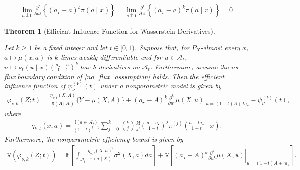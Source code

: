 \documentclass[10pt,a4paper]{amsart}
\newtheorem{theorem}{Theorem}
\begin{document}
\begin{align} \label{no_flux_assumption}
    \lim_{a\downarrow 0} \frac{\partial^j}{\partial a^j} \left\{ (a_\star-a)^k\pi(a\mid x) \right\} =  \lim_{a\uparrow 1} \frac{\partial^j}{\partial a^j} \left\{ (a_\star-a)^k\pi(a\mid x) \right\} = 0
\end{align}

\begin{theorem}[Efficient Influence Function for Wasserstein Derivatives] \label{derivative_EIF}

Let $k\geq1$ be a fixed integer and let $t \in [0, 1)$. Suppose that, for $P_X$-almost every $x$, $a\mapsto\mu(x,a)$ is $k$ times weakly differentiable and for $u \in \mathcal{A}_t$, $u \mapsto \nu_t(u\mid x)(\frac{a_\star-u}{1-t})^k$ has $k$ derivatives on $\mathcal{A}_t$. Furthermore, assume the no-flux boundary condition of \cref{no_flux_assumption} holds. Then the efficient influence function of $\psi^{(k)}_\nu(t)$ under a nonparametric model is given by
\begin{align*}
       \varphi_{\nu,k}(Z;t) =  \frac{\eta_{k, t}(X, A)}{\pi(A \mid X)}\{Y-\mu(X,A)\} + (a_\star-A)^k \frac{\partial^k}{\partial u^k}\mu(X,u) \Big|_{u=(1-t)A + ta_\star} - \psi^{(k)}_\nu(t),
\end{align*}
where 
\begin{align*}
    \eta_{k,t}(x,a) = \frac{\mathbb{I}(a\in\mathcal{A}_t)}{(1-t)^{k+1}} \sum_{j=0}^{k} \binom{k}{j} \frac{k!}{j!} \left( \frac{a-a_\star}{1-t}\right)^j \pi^{(j)}\left(\frac{a-ta_\star}{1-t}\mid x\right).
\end{align*}
Furthermore, the nonparametric efficiency bound is given by
\begin{align*}
    \mathbb{V}(\varphi_{\nu,k}(Z;t)) = \mathbb{E} \! \left[ \int_{\mathcal{A}_t} \frac{\eta_{k,t}(X, a)^2}{\pi(a\mid X)} \sigma^2(X,a)da \right] + \mathbb{V} \!\left[(a_\star-A)^k \left. \frac{\partial^k}{\partial u^k}\mu(X,u) \right|_{u=(1-t)A + t a_\star} \right].
\end{align*}
    
\end{theorem}
\end{document}
